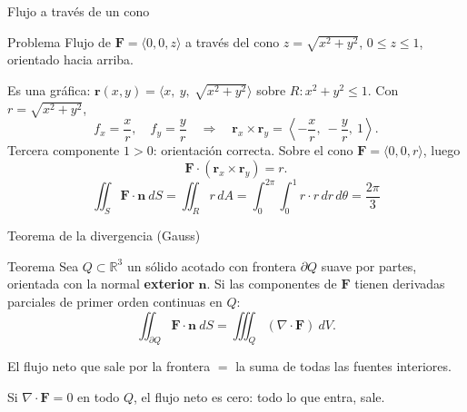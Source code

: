 \documentclass[11pt,aspectratio=169]{beamer}
\begin{document}
\begin{frame}{Flujo a través de un cono}
  \begin{block}{Problema}
    Flujo de $\mathbf F=\langle 0,0,z\rangle$ a través del cono $z=\sqrt{x^2+y^2}$, $0\le z\le1$, orientado hacia arriba.
  \end{block}
  \pause
  Es una gráfica: $\mathbf r(x,y)=\langle x,\ y,\ \sqrt{x^2+y^2}\rangle$ sobre $R:x^2+y^2\le1$. Con $r=\sqrt{x^2+y^2}$,
  \[
    f_x=\frac{x}{r},\quad f_y=\frac{y}{r}
    \quad\Longrightarrow\quad
    \mathbf r_x\times\mathbf r_y = \left\langle -\frac{x}{r},\ -\frac{y}{r},\ 1\right\rangle.
  \]
  \pause
  Tercera componente $1>0$: orientación correcta. Sobre el cono $\mathbf F=\langle0,0,r\rangle$, luego
  \[
    \mathbf F\cdot(\mathbf r_x\times\mathbf r_y) = r.
  \]
  \pause
  \[
    \iint_S \mathbf F\cdot\mathbf n\ dS = \iint_R r\,dA
    = \int_0^{2\pi}\!\!\int_0^1 r\cdot r\,dr\,d\theta = \boxed{\frac{2\pi}{3}}
  \]
\end{frame}


\begin{frame}{Teorema de la divergencia (Gauss)}
  \begin{block}{Teorema}
    Sea $Q\subset\mathbb R^3$ un sólido acotado con frontera $\partial Q$ suave por partes, orientada con la normal \textbf{exterior} $\mathbf n$. Si las componentes de $\mathbf F$ tienen derivadas parciales de primer orden continuas en $Q$:
    \[
      \iint_{\partial Q}\mathbf F\cdot\mathbf n\ dS
      = \iiint_Q (\nabla\cdot\mathbf F)\ dV.
    \]
  \end{block}
  \pause
  \vspace{4pt}
  \begin{center}
  \normalsize\color{tealx}
  El flujo neto que sale por la frontera $=$ la suma de todas las fuentes interiores.
  \end{center}
  \pause
  \begin{center}\small\color{gray60}
  Si $\nabla\cdot\mathbf F=0$ en todo $Q$, el flujo neto es cero: todo lo que entra, sale.
  \end{center}
\end{frame}
\end{document}
